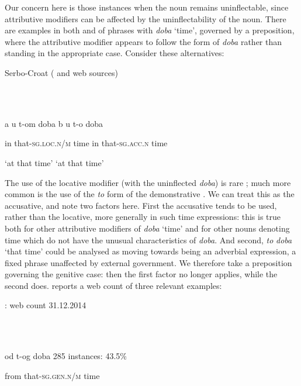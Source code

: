 \documentclass[output=paper]{langscibook}
\begin{document}
Our concern here is those instances when the noun remains uninflectable, since attributive modifiers can be affected by the uninflectability of the noun. There are examples in both \citet{Kovačević1951} and \citet{Stevanović1975} of phrases with \textit{doba} ‘time’, governed by a preposition, where the attributive modifier appears to follow the form of \textit{doba} rather than standing in the appropriate case. Consider these alternatives:

Serbo-Croat (\citealt{Kovačević1951} and web sources)

\ea%
    \label{ex:key:19}
    \gll \\
         \\
    \glt
    \z %

        a  u  t-om  doba  b  u  t-o  doba

  in  that-\textsc{sg.loc.n/m}  time    in  that\textsc{{}-sg.acc.n} time

  ‘at that time’  ‘at that time’

The use of the locative modifier (with the uninflected \textit{doba}) is rare ; much more common is the use of the \textit{to} form of the demonstrative . We can treat this as the accusative, and note two factors here. First the accusative tends to be used, rather than the locative, more generally in such time expressions: this is true both for other attributive modifiers of \textit{doba} ‘time’ \citep[11-13]{Browne2015} and for other nouns denoting time which do not have the unusual characteristics of \textit{doba}. And second, \textit{to} \textit{doba} ‘that time’ could be analysed as moving towards being an adverbial expression, a fixed phrase unaffected by external government. We therefore take a preposition governing the genitive case: then the first factor no longer applies, while the second does. \citet{Browne2015} reports a web count of three relevant examples:

\citet[12]{Browne2015}: web count 31.12.2014

\ea%
    \label{ex:key:20}
    \gll \\
         \\
    \glt
    \z %

          od  t-og  doba    285 instances: 43.5\%

  from  that-\textsc{sg.gen.n/m}  time
\end{document}
